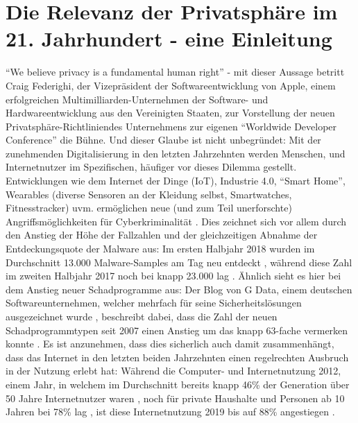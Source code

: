\chapter{Die Relevanz der Privatsphäre im 21. Jahrhundert - eine Einleitung} %
\label{Introduction} %

\enquote{We believe privacy is a fundamental human right} \cite{Apple:2020aa} - mit dieser Aussage betritt Craig Federighi, der Vizepräsident der Softwareentwicklung von Apple, einem erfolgreichen Multimilliarden-Unternehmen der Software- und Hardwareentwicklung aus den Vereinigten Staaten, zur Vorstellung der 
neuen Privatsphäre-Richtliniendes Unternehmens zur eigenen \enquote{Worldwide Developer Conference} die Bühne. \newline Und dieser Glaube ist nicht unbegründet: Mit der zunehmenden Digitalisierung in den letzten Jahrzehnten werden Menschen, und Internetnutzer im Spezifischen, 
häufiger vor dieses Dilemma gestellt. Entwicklungen wie dem Internet der Dinge (IoT), Industrie 4.0, \enquote{Smart Home}, Wearables (diverse Sensoren an der Kleidung selbst, Smartwatches, Fitnesstracker) uvm. ermöglichen neue (und zum Teil unerforschte) Angriffsmöglichkeiten für Cyberkriminalität \cite{Bundeskriminalamt:2018aa}. \newline
Dies zeichnet sich vor allem durch den Anstieg der Höhe der Fallzahlen und der gleichzeitigen Abnahme der Entdeckungsquote der Malware aus: Im ersten Halbjahr 2018 wurden im Durchschnitt 13.000 Malware-Samples am Tag neu entdeckt \cite{GDB:18}, während diese Zahl im zweiten Halbjahr 2017 noch bei knapp 23.000 lag \cite{GDB:17}. \newline Ähnlich sieht es hier bei
dem Anstieg neuer Schadprogramme aus: Der Blog von G Data, einem deutschen Softwareunternehmen, welcher mehrfach für seine Sicherheitslösungen ausgezeichnet wurde \cite{GD:2020aa}, beschreibt dabei, dass die Zahl der neuen Schadprogrammtypen seit 2007 einen Anstieg um das knapp 63-fache vermerken konnte \cite{GDB:17}. 
Es ist anzunehmen, dass dies sicherlich auch damit zusammenhängt, dass das Internet in den letzten beiden Jahrzehnten einen regelrechten Ausbruch in der Nutzung erlebt hat: Während die Computer- und Internetnutzung 2012, einem Jahr, in welchem im Durchschnitt bereits knapp 46\% der Generation über 50 Jahre Internetnutzer waren
\cite{GfK:2016aa}, noch für private Haushalte und Personen ab 10 Jahren bei 78\% lag \cite{Bundesamt:2019aa}, ist diese Internetnutzung 2019 bis auf 88\% angestiegen \cite{Bundesamt:2019aa}. \pagebreak \clearpage
